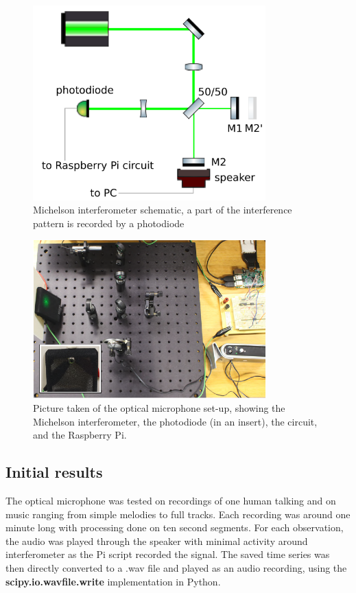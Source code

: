 \documentclass[prb,preprint]{revtex4-1}
\begin{document}
\begin{figure}
	\includegraphics[width=0.8\textwidth]{figures/ifo_schematic_photodiode.pdf}
	\caption{Michelson interferometer schematic, a part of the interference pattern is recorded by a photodiode}
	\label{fig:ifo_schematic_podo}
\end{figure}

\begin{figure}
	\includegraphics[width=0.8\textwidth]{figures/setup_pic2.pdf}
	\caption{Picture taken of the optical microphone set-up, showing the Michelson interferometer, the photodiode (in an insert), the circuit, and the Raspberry Pi.}
	\label{fig:setup_pic2}
\end{figure}

\subsection{Initial results}

The optical microphone was tested on recordings of one human talking and on music ranging from simple melodies to full tracks. Each recording was around one minute long with processing done on ten second segments. For each observation, the audio was played through the speaker with minimal activity around interferometer as the Pi script recorded the signal. The saved time series was then directly converted to a .wav file and played as an audio recording, using the \textbf{scipy.io.wavfile.write}\cite{scipy} implementation in Python\cite{python}.
\end{document}
